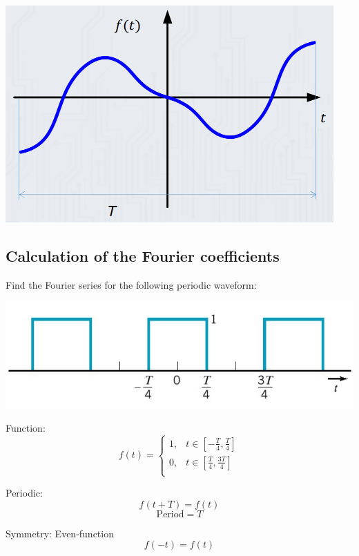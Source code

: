 \documentclass[11pt]{article}
\begin{document}
\begin{center}
\includegraphics[width=.9\linewidth]{./images/odd-function-fourier-series-representation.png}
\end{center}

 \newpage
\subsection{Calculation of the Fourier coefficients}
\label{sec:orgac658f6}
Find the Fourier series for the following periodic waveform:
\begin{center}
\includegraphics[width=.9\linewidth]{./images/even-square-wave-function.png}
\end{center}

Function:
\begin{displaymath}
f(t) = \begin{cases}
1, & t \in [-\frac{T}{4}, \frac{T}{4}] \\
0, & t \in [\frac{T}{4}, \frac{3T}{4}] \\
\end{cases}
\end{displaymath}

Periodic:
\[f(t + T) = f(t)\]
\[\text{Period} = T\]

Symmetry: Even-function
\[f(-t) = f(t)\]
\end{document}
